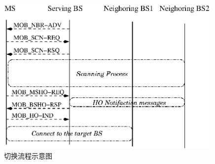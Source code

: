 \begin{figure}[t]
\centering
\includegraphics[height=7.75cm]{iccs_handover}
\caption{切换流程示意图}
\label{fig:chap_iccs_handover_algorithm_handover_flow}
\end{figure}

